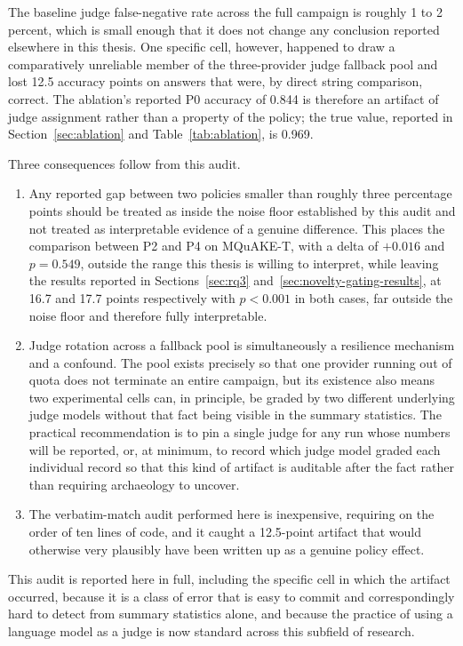 The baseline judge false-negative rate across the full campaign is roughly 1 to 2 percent, which is small enough that it does not change any conclusion reported elsewhere in this thesis. One specific cell, however, happened to draw a comparatively unreliable member of the three-provider judge fallback pool and lost 12.5 accuracy points on answers that were, by direct string comparison, correct. The ablation's reported P0 accuracy of 0.844 is therefore an artifact of judge assignment rather than a property of the policy; the true value, reported in Section~\ref{sec:ablation} and Table~\ref{tab:ablation}, is 0.969.

Three consequences follow from this audit.

\begin{enumerate}
\item Any reported gap between two policies smaller than roughly three percentage points should be treated as inside the noise floor established by this audit and not treated as interpretable evidence of a genuine difference. This places the comparison between P2 and P4 on MQuAKE-T, with a delta of $+0.016$ and $p = 0.549$, outside the range this thesis is willing to interpret, while leaving the results reported in Sections~\ref{sec:rq3} and~\ref{sec:novelty-gating-results}, at 16.7 and 17.7 points respectively with $p < 0.001$ in both cases, far outside the noise floor and therefore fully interpretable.
\item Judge rotation across a fallback pool is simultaneously a resilience mechanism and a confound. The pool exists precisely so that one provider running out of quota does not terminate an entire campaign, but its existence also means two experimental cells can, in principle, be graded by two different underlying judge models without that fact being visible in the summary statistics. The practical recommendation is to pin a single judge for any run whose numbers will be reported, or, at minimum, to record which judge model graded each individual record so that this kind of artifact is auditable after the fact rather than requiring archaeology to uncover.
\item The verbatim-match audit performed here is inexpensive, requiring on the order of ten lines of code, and it caught a 12.5-point artifact that would otherwise very plausibly have been written up as a genuine policy effect.
\end{enumerate}

This audit is reported here in full, including the specific cell in which the artifact occurred, because it is a class of error that is easy to commit and correspondingly hard to detect from summary statistics alone, and because the practice of using a language model as a judge is now standard across this subfield of research.

